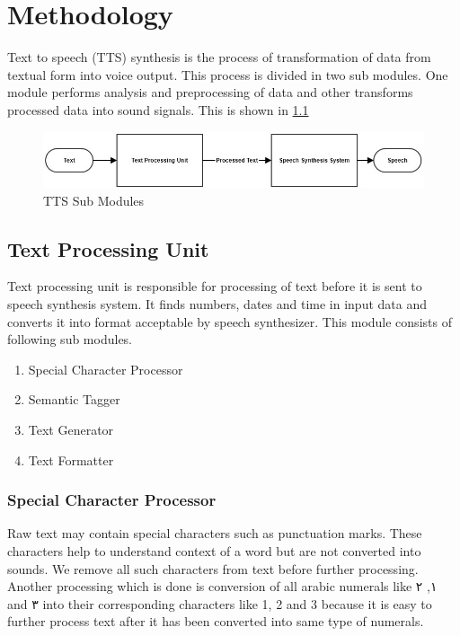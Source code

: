 \chapter{Methodology}

Text to speech (TTS) synthesis is the process of transformation of data from textual form into voice output. This process is divided in two sub modules. One module performs analysis and preprocessing of data and other transforms processed data into sound signals. This is shown in \ref{fig:TTS Sub Modules}

\begin{figure}[hp]
  \centering
  \includegraphics[width=\linewidth]{images/tts_flow_dg.jpg}
  \caption{TTS Sub Modules}
  \label{fig:TTS Sub Modules}
\end{figure}

\section{Text Processing Unit}
Text processing unit is responsible for processing of text before it is sent to speech synthesis system. It finds numbers, dates and time in input data and converts it into format acceptable by speech synthesizer. This module consists of following sub modules.

\begin{enumerate}
  \item Special Character Processor
  \item Semantic Tagger  
  \item Text Generator
  \item Text Formatter 
\end{enumerate}

\subsection{Special Character Processor}

Raw text may contain special characters such as punctuation marks. These characters help to understand context of a word but 
are not converted into sounds. We remove all such characters from text before further processing. 
Another processing which is done is conversion of all arabic numerals like \textarabic{١}, \textarabic{٢} and \textarabic{٣} into their corresponding 
characters like 1, 2 and 3 because it is easy to further process text after it has been converted into same type of numerals.

